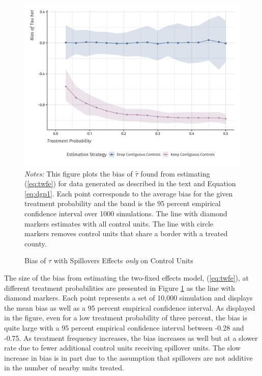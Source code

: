 \documentclass[11pt]{article}
\begin{document}
\begin{figure}[tb!]
    \caption{Bias of $\hat{\tau}$ with Spillovers Effects \emph{only} on Control Units}
    \label{fig:bias_as_treat_prob}
    {\centering
        \includegraphics[width=\textwidth]{../../figures/figure-bias_fix.png}
    } 
    {\footnotesize
        \textit{Notes:} This figure plots the bias of $\hat{\tau}$ found from estimating (\ref{eq:twfe}) for data generated as described in the text and Equation \ref{eq:dgp1}. Each point corresponds to the average bias for the given treatment probability and the band is the 95 percent empirical confidence interval over 1000 simulations. The line with diamond markers estimates with all control units. The line with circle markers removes control units that share a border with a treated county. 
    }
\end{figure}

The size of the bias from estimating the two-fixed effects model, (\ref{eq:twfe}), at different treatment probabilities are presented in Figure \ref{fig:bias_as_treat_prob} as the line with diamond markers. Each point represents a set of 10,000 simulation and displays the mean bias as well as a 95 percent empirical confidence interval. As displayed in the figure, even for a low treatment probability of three percent, the bias is quite large with a 95 percent empirical confidence interval between -0.28 and -0.75. As treatment frequency increases, the bias increases as well but at a slower rate due to fewer additional control units receiving spillover units. The slow increase in bias is in part due to the assumption that spillovers are not additive in the number of nearby units treated.
\end{document}
